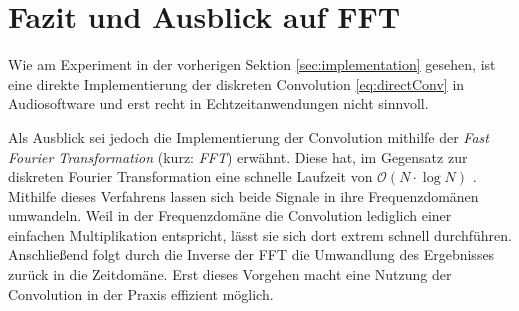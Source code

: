 \section{Fazit und Ausblick auf FFT}
\label{sec:implementationconclusion}

Wie am Experiment in der vorherigen Sektion \ref{sec:implementation} gesehen, ist eine
direkte Implementierung der diskreten Convolution \ref{eq:directConv} in Audiosoftware und erst recht
in Echtzeitanwendungen nicht sinnvoll.

Als Ausblick sei jedoch die Implementierung der Convolution mithilfe der
\textit{Fast Fourier Transformation} (kurz: \textit{FFT}) erwähnt.
Diese hat, im Gegensatz zur diskreten Fourier Transformation eine schnelle Laufzeit von
$\mathcal{O}(N \cdot \log{N})$ \cite[Kap. 12]{smith1997}.
Mithilfe dieses Verfahrens lassen sich beide Signale in ihre Frequenzdomänen umwandeln. Weil
in der Frequenzdomäne die Convolution lediglich einer einfachen Multiplikation entspricht, lässt sie
sich dort extrem schnell durchführen. Anschließend folgt durch die Inverse der FFT
die Umwandlung des Ergebnisses zurück in die Zeitdomäne.
Erst dieses Vorgehen macht eine Nutzung der Convolution in der Praxis effizient möglich.